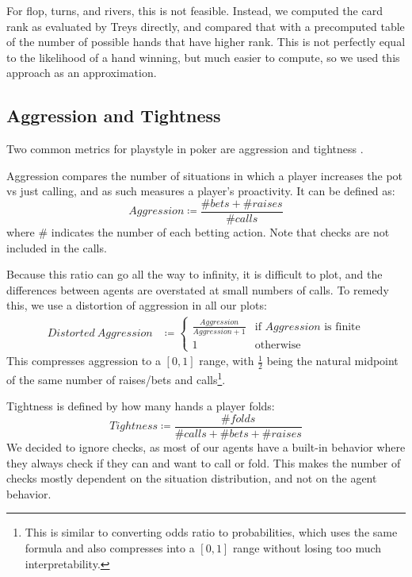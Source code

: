 For flop, turns, and rivers, this is not feasible. Instead, we computed the card rank as evaluated by Treys \cite{Treys} directly, and compared that with a precomputed table of the number of possible hands that have higher rank. This is not perfectly equal to the likelihood of a hand winning, but much easier to compute, so we used this approach as an approximation.

\subsection{Aggression and Tightness}

Two common metrics for playstyle in poker are aggression and tightness \cite{PokerStrategy}.

Aggression compares the number of situations in which a player increases the pot vs just calling, and as such measures a player's proactivity. It can be defined as:
\begin{equation}
    Aggression \coloneqq \frac{\# bets + \# raises}{\# calls}
\end{equation} where \# indicates the number of each betting action. Note that checks are not included in the calls.

Because this ratio can go all the way to infinity, it is difficult to plot, and the differences between agents are overstated at small numbers of calls. To remedy this, we use a distortion of aggression in all our plots:
\begin{equation}
\begin{split}
Distorted\ Aggression &\coloneqq \begin{cases}
\frac{Aggression}{Aggression + 1} &\mbox{if }Aggression\mbox{ is finite} \\
1 &\mbox{otherwise}
\end{cases}
\end{split}
\end{equation}
This compresses aggression to a $[0, 1]$ range, with $\frac{1}{2}$ being the natural midpoint of the same number of raises/bets and calls\footnote{This is similar to converting odds ratio to probabilities, which uses the same formula and also compresses into a $[0, 1]$ range without losing too much interpretability.}.

Tightness is defined by how many hands a player folds:
\begin{equation}
    Tightness \coloneqq \frac{\# folds}{\# calls + \# bets + \# raises}
\end{equation}
We decided to ignore checks, as most of our agents have a built-in behavior where they always check if they can and want to call or fold. This makes the number of checks mostly dependent on the situation distribution, and not on the agent behavior.

